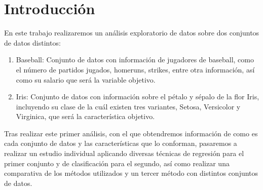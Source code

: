 \section{Introducción}

En este trabajo realizaremos un análisis exploratorio de datos sobre dos conjuntos de datos distintos:

\begin{enumerate}
	\item Baseball: Conjunto de datos con información de jugadores de baseball, como el número de partidos jugados, homeruns, strikes, entre otra información, así como su salario que será la variable objetivo.
	\item Iris: Conjunto de datos con información sobre el pétalo y sépalo de la flor Iris, incluyendo su clase de la cuál existen tres variantes, Setosa, Versicolor y Virginica, que será la característica objetivo.
\end{enumerate}

Tras realizar este primer análisis, con el que obtendremos información de como es cada conjunto de datos y las características que lo conforman, pasaremos a realizar un estudio individual aplicando diversas técnicas de regresión para el primer conjunto y de clasificación para el segundo, así como realizar una comparativa de los métodos utilizados y un tercer método con distintos conjuntos de datos.
